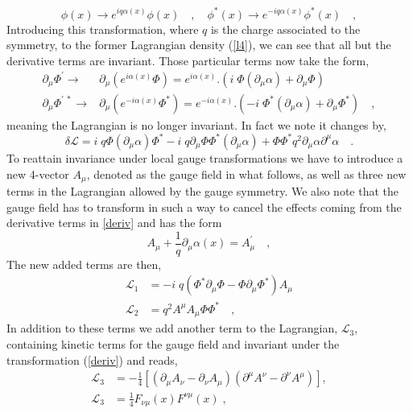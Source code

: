 %
\begin{equation}
\phi(x) \rightarrow e^{i q \alpha (x)} \phi (x) \quad , \quad \phi^*  (x)\rightarrow e^{-i q \alpha (x)} \phi^* (x)  \quad ,
\end{equation}
%
Introducing this transformation, where $q$ is the charge associated to the symmetry, to the former Lagrangian density (\ref{l4}), we can see that all but the derivative terms are invariant. Those particular terms now take the form,
%
\begin{align}
\partial_\mu \Phi^\prime \rightarrow &  \partial_\mu \left(e^{i \alpha(x)} \Phi \right) = e^{i \alpha \left(x\right)}.\left(  i \; \Phi (\partial_\mu \alpha )   + \partial_\mu \Phi \right) \\
\partial_\mu \Phi^{\prime \ *} \rightarrow &  \partial_\mu \left( e^{-i \alpha \left(x \right)} \Phi^* \right) =  e^{-i \alpha \left(x \right)}.\left(  -i \; \Phi^* (\partial_\mu \alpha )   + \partial_\mu \Phi^* \right) \quad , 
\label{deriv}
\end{align}
%
meaning the Lagrangian is no longer invariant. In fact we note it changes by, 
\begin{equation}
\delta \mathcal{L} =   i \; q \Phi (\partial_\mu \alpha )  \Phi^* - i \; q \partial_\mu \Phi \Phi^* (\partial_\mu \alpha ) + \Phi \Phi^* q^2 \partial_\mu \alpha \partial^\mu \alpha    \quad . 
\end{equation}
%
To reattain invariance under local gauge transformations we have to introduce a new 4-vector $A_\mu$, denoted as the gauge field in what follows, as well as three new terms in the Lagrangian allowed by the gauge symmetry. We also note that the gauge field has to transform in such a way to cancel the effects coming from the derivative terms in \ref{deriv} and has the form
%
%
\begin{equation}
 A_\mu + \frac{1}{q} \partial_\mu \alpha \left(x \right)=A_\mu^\prime \quad , 
\end{equation} 
%
The new added terms are then,
%
\begin{align}
\mathcal{L}_1 & =  - i \; q \left( \Phi^* \partial_\mu \Phi  - \Phi \partial_\mu \Phi^* \right) A_\mu \\
\mathcal{L}_2 & =  q^2  A^\mu A_\mu \Phi \Phi^*  \quad , 
\end{align}
%
%
In addition to these terms we add another term to the Lagrangian, $\mathcal{L}_3$, containing kinetic terms for the gauge field and invariant under the transformation (\ref{deriv}) and reads,
%
\begin{align}
\mathcal{L}_3 & = -\frac{1}{4} \left[ \left( \partial_\mu A_\nu - \partial_\nu A_\mu \right) \left( \partial^\mu A^\nu - \partial^\nu A^\mu \right) \right] , \nonumber \\ \mathcal{L}_3  &= \frac{1}{4} F_{\nu \mu}(x)  F^{\nu \mu}(x) \;  , 
\end{align}

